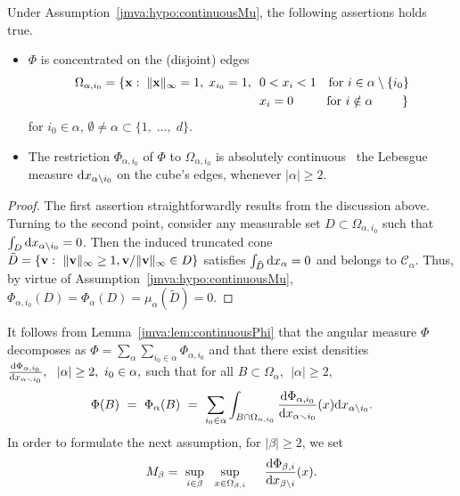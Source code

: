 \begin{lemma}\label{jmva:lem:continuousPhi}
Under Assumption~\ref{jmva:hypo:continuousMu}, the following assertions holds true.
\begin{itemize}
\item  $ \Phi$ is concentrated on the (disjoint) edges
\begin{align}
   \Omega_{\alpha,i_0} = \{\mathbf x: \; \| {\mathbf x}\|_{\infty}  = 1,\; x_{i_0} = 1,~~& 0<  x_i < 1 ~~\text{~for~} i \in \alpha \setminus \{i_0\}\\ \nonumber
&x_i=0 ~~~~\text{~~~ for } i\notin \alpha ~~~~~~~\} \nonumber
\end{align}
for $i_0\in\alpha$, $\emptyset \neq \alpha\subset\{1,\; \ldots,\; d \}$.
\item The restriction $\Phi_{\alpha,i_0}$ of $\Phi$ to
  $\Omega_{\alpha,i_0}$ is absolutely continuous \wrt~the Lebesgue measure $\mathrm{d} x_{\alpha\setminus{i_0}}$ on the cube's edges, whenever $|\alpha|\ge 2 $.

\end{itemize}
\end{lemma}
\begin{proof}
  The first assertion straightforwardly results from the discussion above.  Turning to the
  second point, consider any  measurable
  set $D \subset \Omega_{\alpha,i_0}$ such that $\int_{D}\mathrm{d} x_{\alpha \setminus i_0} = 0$. Then the
  induced truncated cone $\tilde D = \{ \mathbf v:~ \|\mathbf v\|_\infty \ge
  1, \mathbf v / \|\mathbf v\|_\infty \in D \}$ satisfies $\int_{\tilde D}\mathrm{d}
  x_{\alpha} = 0$ and belongs to $\mathcal{C}_\alpha$. Thus,  by virtue of
  Assumption~\ref{jmva:hypo:continuousMu}, $\Phi_{\alpha,
    i_0}(D)=\Phi_{\alpha}(D) = \mu_\alpha(\tilde D) = 0$.
\end{proof}

\noindent
It follows from Lemma~\ref{jmva:lem:continuousPhi} that the angular
measure $\Phi$ decomposes as $\Phi = \sum_{\alpha} \sum_{i_0\in\alpha}
\Phi_{\alpha,i_0}$  and that there exist densities $ \frac{\mathrm{d}
  \Phi_{\alpha,i_0}}{\mathrm{d} x_{ \alpha \smallsetminus i_0}},~~
|\alpha|\ge 2,~i_0\in\alpha,$ such that for all $B \subset
\Omega_\alpha,~~ |\alpha| \ge 2$,
\begin{align}
\label{jmva:eq:decomposePhi}
\Phi(B)~=~ \Phi_\alpha(B)~=~ \sum_{i_0\in\alpha} \int_{B\cap \Omega_{
    \alpha,i_0} } \frac{\mathrm{d} \Phi_{\alpha,i_0}}{\mathrm{d} x_{ \alpha
    \smallsetminus i_0}}(x) \mathrm{d} x_{\alpha\setminus i_0}. 
\end{align}
In order to formulate the next assumption, for $|\beta| \ge 2$, we set
\begin{align}
\label{jmva:eq:supDensity}
M_\beta = %
~ \sup_{i \in\beta} ~~\sup_{x\in\Omega_{\beta,i}} ~~~~ \frac{\ud  \Phi_{\beta, i}}{\ud x_{\beta \setminus i}}(x).
\end{align}


